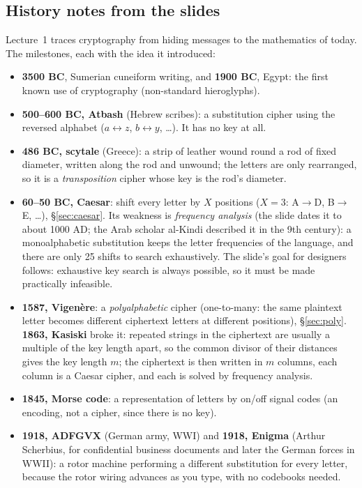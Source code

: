 \subsection{History notes from the slides}
Lecture~1 traces cryptography from hiding messages to the mathematics of today. The milestones, each with the idea it introduced:
\begin{itemize}[leftmargin=1.4em]
  \item \textbf{3500 BC}, Sumerian cuneiform writing, and \textbf{1900 BC}, Egypt: the first known use of cryptography (non-standard hieroglyphs).
  \item \textbf{500--600 BC, Atbash} (Hebrew scribes): a substitution cipher using the reversed alphabet ($a \leftrightarrow z$, $b \leftrightarrow y$, \dots). It has no key at all.
  \item \textbf{486 BC, scytale} (Greece): a strip of leather wound round a rod of fixed diameter, written along the rod and unwound; the letters are only rearranged, so it is a \emph{transposition} cipher whose key is the rod's diameter.
  \item \textbf{60--50 BC, Caesar}: shift every letter by $X$ positions ($X = 3$: A$\to$D, B$\to$E, \dots), \S\ref{sec:caesar}. Its weakness is \emph{frequency analysis} (the slide dates it to about 1000 AD; the Arab scholar al-Kindi described it in the 9th century): a monoalphabetic substitution keeps the letter frequencies of the language, and there are only 25 shifts to search exhaustively. The slide's goal for designers follows: exhaustive key search is always possible, so it must be made practically infeasible.
  \item \textbf{1587, Vigen\`ere}: a \emph{polyalphabetic} cipher (one-to-many: the same plaintext letter becomes different ciphertext letters at different positions), \S\ref{sec:poly}. \textbf{1863, Kasiski} broke it: repeated strings in the ciphertext are usually a multiple of the key length apart, so the common divisor of their distances gives the key length $m$; the ciphertext is then written in $m$ columns, each column is a Caesar cipher, and each is solved by frequency analysis.
  \item \textbf{1845, Morse code}: a representation of letters by on/off signal codes (an encoding, not a cipher, since there is no key).
  \item \textbf{1918, ADFGVX} (German army, WWI) and \textbf{1918, Enigma} (Arthur Scherbius, for confidential business documents and later the German forces in WWII): a rotor machine performing a different substitution for every letter, because the rotor wiring advances as you type, with no codebooks needed.

\end{itemize}
